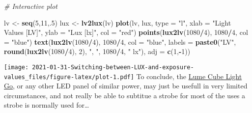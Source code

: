 \documentclass[
]{article}
\newenvironment{Shaded}{\begin{snugshade}}{\end{snugshade}}
\newcommand{\CommentTok}[1]{\textcolor[rgb]{0.56,0.35,0.01}{\textit{#1}}}
\newcommand{\DataTypeTok}[1]{\textcolor[rgb]{0.13,0.29,0.53}{#1}}
\newcommand{\DecValTok}[1]{\textcolor[rgb]{0.00,0.00,0.81}{#1}}
\newcommand{\KeywordTok}[1]{\textcolor[rgb]{0.13,0.29,0.53}{\textbf{#1}}}
\newcommand{\NormalTok}[1]{#1}
\newcommand{\OperatorTok}[1]{\textcolor[rgb]{0.81,0.36,0.00}{\textbf{#1}}}
\newcommand{\StringTok}[1]{\textcolor[rgb]{0.31,0.60,0.02}{#1}}
\begin{document}
\begin{Shaded}
\begin{Highlighting}[]
\CommentTok{# Interactive plot}

\NormalTok{lv <-}\StringTok{ }\KeywordTok{seq}\NormalTok{(}\DecValTok{5}\NormalTok{,}\DecValTok{11}\NormalTok{,.}\DecValTok{5}\NormalTok{)}
\NormalTok{lux <-}\StringTok{ }\KeywordTok{lv2lux}\NormalTok{(lv)}
\KeywordTok{plot}\NormalTok{(lv, lux, }\DataTypeTok{type =} \StringTok{"l"}\NormalTok{,}
     \DataTypeTok{xlab =} \StringTok{"Light Values [LV]"}\NormalTok{, }\DataTypeTok{ylab =} \StringTok{"Lux [lx]"}\NormalTok{,}
     \DataTypeTok{col =} \StringTok{"red"}\NormalTok{)}
\KeywordTok{points}\NormalTok{(}\KeywordTok{lux2lv}\NormalTok{(}\DecValTok{1080}\OperatorTok{/}\DecValTok{4}\NormalTok{), }\DecValTok{1080}\OperatorTok{/}\DecValTok{4}\NormalTok{, }\DataTypeTok{col =} \StringTok{"blue"}\NormalTok{)}
\KeywordTok{text}\NormalTok{(}\KeywordTok{lux2lv}\NormalTok{(}\DecValTok{1080}\OperatorTok{/}\DecValTok{4}\NormalTok{), }\DecValTok{1080}\OperatorTok{/}\DecValTok{4}\NormalTok{, }\DataTypeTok{col =} \StringTok{"blue"}\NormalTok{,}
     \DataTypeTok{labels =} \KeywordTok{paste0}\NormalTok{(}\StringTok{"LV"}\NormalTok{, }\KeywordTok{round}\NormalTok{(}\KeywordTok{lux2lv}\NormalTok{(}\DecValTok{1080}\OperatorTok{/}\DecValTok{4}\NormalTok{), }\DecValTok{2}\NormalTok{), }\StringTok{", "}\NormalTok{, }\DecValTok{1080}\OperatorTok{/}\DecValTok{4}\NormalTok{, }\StringTok{" lx"}\NormalTok{),}
     \DataTypeTok{adj =} \KeywordTok{c}\NormalTok{(}\DecValTok{1}\NormalTok{,}\OperatorTok{-}\DecValTok{1}\NormalTok{))}
\end{Highlighting}
\end{Shaded}

\texttt{[image: 2021-01-31-Switching-between-LUX-and-exposure-values\_files/figure-latex/plot-1.pdf]}
To conclude, the \href{https://lumecube.com/products/panel-go}{Lume Cube
Light Go}, or any other LED panel of similar power, may just be usefull
in very limited circumstances, and not really be able to subtitue a
strobe for most of the uses a strobe is normally used for\ldots{}
\end{document}
